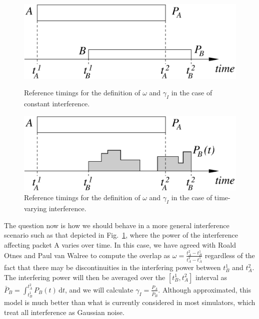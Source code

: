 \documentclass[11pt,journal,draftclsnofoot,onecolumn,twoside,letterpaper]{IEEEtran}
\newcommand{\de}[1]{\,\mathrm{d}#1}
\theoremstyle{definition} \newtheorem{definition}[]{Definition}
\theoremstyle{theorem} \newtheorem{theorem}[]{Theorem}
\begin{document}
\begin{figure}[h!]
  \begin{minipage}[t]{0.48\columnwidth}
	\centering
	\includegraphics[width=\linewidth]{figures/collision_simple.eps}
	\caption{Reference timings for the definition of $\omega$ and $\gamma_I$ in the case of constant interference.}
	\label{fig:coll1}
  \end{minipage}
  \hfill
  \begin{minipage}[t]{0.48\linewidth}
	\centering
	\includegraphics[width=\linewidth]{figures/collision.eps}
	\caption{Reference timings for the definition of $\omega$ and $\gamma_I$ in the case of time-varying interference.}
	\label{fig:coll2}
  \end{minipage}
\end{figure}

The question now is how we should behave in a more general interference scenario such as that depicted in Fig.~\ref{fig:coll2}, where the power of the interference affecting packet A varies over time. In this case, we have agreed with Roald Otnes and Paul van Walree to compute the overlap as $\omega = \frac{t_A^2 - t_B^1}{t_A^2-t_A^1}$ regardless of the fact that there may be discontinuities in the interfering power between $t_B^1$ and $t_A^2$. The interfering power will then be averaged over the $[t_B^1,t_A^2]$ interval as $\bar{P}_B = \int_{t_B^1}^{t_A^2} P_B (t) \de{t}$, and we will calculate $\gamma_I = \frac{P_A}{\bar{P}_B}$.
Although approximated, this model is much better than what is currently considered in most simulators, which treat all interference as Gaussian noise.
\end{document}

